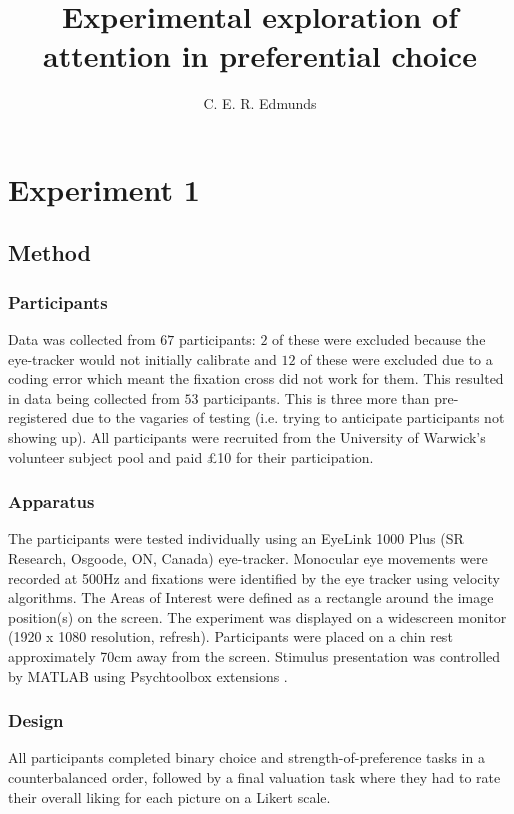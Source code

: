 \documentclass[doc, a4paper, apacite]{apa6}
\title{Experimental exploration of attention in preferential choice}
\author{C. E. R. Edmunds}
\affiliation{University of Warwick}
\begin{document}
\maketitle


\section{Experiment 1} \label{exp:NS01} 
\subsection{Method}
\subsubsection{Participants}
Data was collected from $67$ participants: $2$ of these were excluded because the eye-tracker would not initially calibrate and $12$ of these were excluded due to a coding error which meant the fixation cross did not work for them. This resulted in data being collected from $53$ participants. This is three more than pre-registered due to the vagaries of testing (i.e. trying to anticipate participants not showing up). All participants were recruited from the University of Warwick's volunteer subject pool and paid \pounds10 for their participation.

\subsubsection{Apparatus}
The participants were tested individually using an EyeLink 1000 Plus (SR Research, Osgoode, ON, Canada) eye-tracker. Monocular eye movements were recorded at 500Hz and fixations were identified by the eye tracker using velocity algorithms. The Areas of Interest were defined as a rectangle around the image position(s) on the screen. The experiment was displayed on a widescreen monitor (1920 x 1080 resolution, refresh). Participants were placed on a chin rest approximately 70cm away from the screen. Stimulus presentation was controlled by MATLAB using Psychtoolbox extensions \cite{Brainard1997, Pelli1997}.

\subsubsection{Design}
All participants completed binary choice and strength-of-preference tasks in a counterbalanced order, followed by a final valuation task where they had to rate their overall liking for each picture on a Likert scale. 
\end{document}
